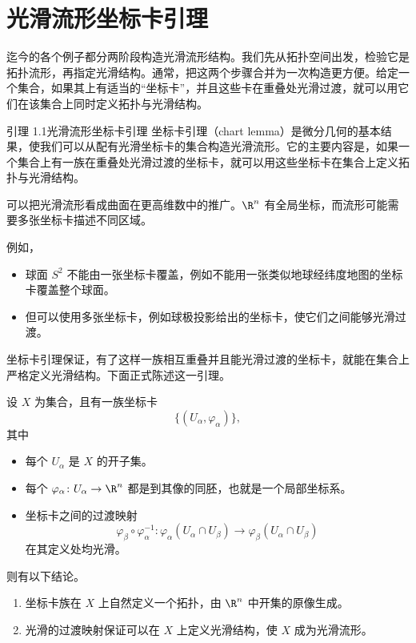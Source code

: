 \section{光滑流形坐标卡引理}
迄今的各个例子都分两阶段构造光滑流形结构。我们先从拓扑空间出发，检验它是拓扑流形，再指定光滑结构。通常，把这两个步骤合并为一次构造更方便。给定一个集合，如果其上有适当的“坐标卡”，并且这些卡在重叠处光滑过渡，就可以用它们在该集合上同时定义拓扑与光滑结构。

\begin{statement}{引理 1.1}{光滑流形坐标卡引理}
坐标卡引理（chart lemma）是微分几何的基本结果，使我们可以从配有光滑坐标卡的集合构造光滑流形。它的主要内容是，如果一个集合上有一族在重叠处光滑过渡的坐标卡，就可以用这些坐标卡在集合上定义拓扑与光滑结构。
\end{statement}

可以把光滑流形看成曲面在更高维数中的推广。$\R^n$ 有全局坐标，而流形可能需要多张坐标卡描述不同区域。

例如，
\begin{itemize}
  \item 球面 $S^2$ 不能由一张坐标卡覆盖，例如不能用一张类似地球经纬度地图的坐标卡覆盖整个球面。
  \item 但可以使用多张坐标卡，例如球极投影给出的坐标卡，使它们之间能够光滑过渡。
\end{itemize}
坐标卡引理保证，有了这样一族相互重叠并且能光滑过渡的坐标卡，就能在集合上严格定义光滑结构。下面正式陈述这一引理。

设 $X$ 为集合，且有一族坐标卡
\[
  \{(U_\alpha,\varphi_\alpha)\},
\]
其中
\begin{itemize}
  \item 每个 $U_\alpha$ 是 $X$ 的开子集。
  \item 每个 $\varphi_\alpha\colon U_\alpha\to\R^n$ 都是到其像的同胚，也就是一个局部坐标系。
  \item 坐标卡之间的过渡映射
  \[
    \varphi_\beta\circ\varphi_\alpha^{-1}\colon
    \varphi_\alpha(U_\alpha\cap U_\beta)
    \longrightarrow\varphi_\beta(U_\alpha\cap U_\beta)
  \]
  在其定义处均光滑。
\end{itemize}
则有以下结论。
\begin{enumerate}
  \item 坐标卡族在 $X$ 上自然定义一个拓扑，由 $\R^n$ 中开集的原像生成。
  \item 光滑的过渡映射保证可以在 $X$ 上定义光滑结构，使 $X$ 成为光滑流形。
\end{enumerate}

